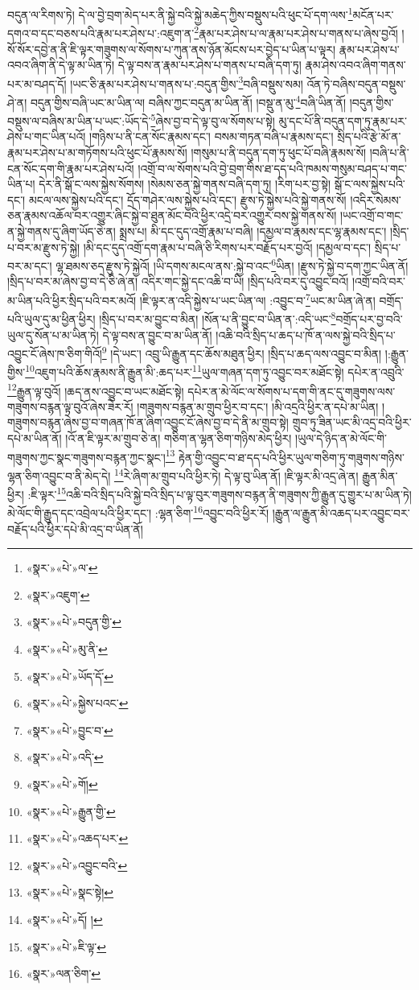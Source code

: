 བདུན་ལ་རིགས་ཏེ། དེ་ལ་བྱེ་བྲག་མེད་པར་ནི་སྐྱེ་བའི་སྐྱེ་མཆེད་ཀྱིས་བསྡུས་པའི་ཕུང་པོ་དག་ལས་\footnote{«སྣར་»«པེ་»ལ་}མངོན་པར་དགའ་བ་དང་བཅས་པའི་རྣམ་པར་ཤེས་པ་:འཇུག་ན་\footnote{«སྣར་»འཇུག་}རྣམ་པར་ཤེས་པ་ལ་རྣམ་པར་ཤེས་པ་གནས་པ་ཞེས་བྱའོ། །སོ་སོར་དབྱེ་ན་ནི་ཇི་ལྟར་གཟུགས་ལ་སོགས་པ་ཀུན་ནས་ཉོན་མོངས་པར་བྱེད་པ་ཡིན་པ་ལྟར། རྣམ་པར་ཤེས་པ་འབའ་ཞིག་ནི་དེ་ལྟ་མ་ཡིན་ཏེ། དེ་ལྟ་བས་ན་རྣམ་པར་ཤེས་པ་གནས་པ་བཞི་དག་ཏུ། རྣམ་ཤེས་འབའ་ཞིག་གནས་པར་མ་བཤད་དོ། །ཡང་ཅི་རྣམ་པར་ཤེས་པ་གནས་པ་:བདུན་གྱིས་\footnote{«སྣར་»«པེ་»བདུན་གྱི་}བཞི་བསྡུས་སམ། འོན་ཏེ་བཞིས་བདུན་བསྡུས་ཤེ་ན། བདུན་གྱིས་བཞི་ཡང་མ་ཡིན་ལ། བཞིས་ཀྱང་བདུན་མ་ཡིན་ནོ། །བསྡུ་ན་མུ་\footnote{«སྣར་»«པེ་»མུ་ནི་}བཞི་ཡིན་ནོ། །བདུན་གྱིས་བསྡུས་ལ་བཞིས་མ་ཡིན་པ་ཡང་:ཡོད་དེ་\footnote{«སྣར་»«པེ་»ཡོད་དོ་}ཞེས་བྱ་བ་དེ་ལྟ་བུ་ལ་སོགས་པ་སྟེ། མུ་དང་པོ་ནི་བདུན་དག་ཏུ་རྣམ་པར་ཤེས་པ་གང་ཡིན་པའོ། །གཉིས་པ་ནི་ངན་སོང་རྣམས་དང་། བསམ་གཏན་བཞི་པ་རྣམས་དང་། སྲིད་པའི་རྩེ་མོ་ན་རྣམ་པར་ཤེས་པ་མ་གཏོགས་པའི་ཕུང་པོ་རྣམས་སོ། །གསུམ་པ་ནི་བདུན་དག་ཏུ་ཕུང་པོ་བཞི་རྣམས་སོ། །བཞི་པ་ནི་ངན་སོང་དག་གི་རྣམ་པར་ཤེས་པའོ། །འགྲོ་བ་ལ་སོགས་པའི་བྱེ་བྲག་གིས་ཐ་དད་པའི་ཁམས་གསུམ་བཤད་པ་གང་ཡིན་པ། དེར་ནི་སྒོ་ང་ལས་སྐྱེས་སོགས། །སེམས་ཅན་སྐྱེ་གནས་བཞི་དག་ཏུ། །རིག་པར་བྱ་སྟེ། སྒོ་ང་ལས་སྐྱེས་པའི་དང་། མངལ་ལས་སྐྱེས་པའི་དང་། དྲོད་གཤེར་ལས་སྐྱེས་པའི་དང་། རྫུས་ཏེ་སྐྱེས་པའི་སྐྱེ་གནས་སོ། །འདིར་སེམས་ཅན་རྣམས་འཆོལ་བར་འགྱུར་ཞིང་སྐྱེ་བ་ཐུན་མོང་བའི་ཕྱིར་འདྲེ་བར་འགྱུར་བས་སྐྱེ་གནས་སོ། །ཡང་འགྲོ་བ་གང་ན་སྐྱེ་གནས་དུ་ཞིག་ཡོད་ཅེ་ན། སྨྲས་པ། མི་དང་དུད་འགྲོ་རྣམ་པ་བཞི། །དམྱལ་བ་རྣམས་དང་ལྷ་རྣམས་དང་། །སྲིད་པ་བར་མ་རྫུས་ཏེ་སྐྱེ། །མི་དང་དུད་འགྲོ་དག་རྣམ་པ་བཞི་ཅི་རིགས་པར་བརྗོད་པར་བྱའོ། །དམྱལ་བ་དང་། སྲིད་པ་བར་མ་དང་། ལྷ་ཐམས་ཅད་རྫུས་ཏེ་སྐྱེའོ། །ཡི་དགས་མངལ་ནས་:སྐྱེ་བ་འང་\footnote{«སྣར་»«པེ་»སྐྱེས་པའང་}ཡིན། །རྫུས་ཏེ་སྐྱེ་བ་དག་ཀྱང་ཡིན་ནོ། །སྲིད་པ་བར་མ་ཞེས་བྱ་བ་དེ་ཅི་ཞེ་ན། འདིར་གང་སྐྱེ་དང་འཆི་བ་ཡི། །སྲིད་པའི་བར་དུ་འབྱུང་བའོ། །འགྲོ་བའི་བར་མ་ཡིན་པའི་ཕྱིར་སྲིད་པའི་བར་མའོ། །ཇི་ལྟར་ན་འདི་སྐྱེས་པ་ཡང་ཡིན་ལ། :འབྱུང་བ་\footnote{«སྣར་»«པེ་»བྱུང་བ་}ཡང་མ་ཡིན་ཞེ་ན། བགྲོད་པའི་ཡུལ་དུ་མ་ཕྱིན་ཕྱིར། །སྲིད་པ་བར་མ་བྱུང་བ་མིན། །སོན་པ་ནི་བྱུང་བ་ཡིན་ན་:འདི་ཡང་\footnote{«སྣར་»«པེ་»འདི་}བགྲོད་པར་བྱ་བའི་ཡུལ་དུ་སོན་པ་མ་ཡིན་ཏེ། དེ་ལྟ་བས་ན་བྱུང་བ་མ་ཡིན་ནོ། །འཆི་བའི་སྲིད་པ་ཆད་པ་ཁོ་ན་ལས་སྐྱེ་བའི་སྲིད་པ་འབྱུང་ངོ་ཞེས་ཁ་ཅིག་གིའོ།\footnote{«སྣར་»«པེ་»གོ།} །དེ་ཡང་། འབྲུ་ཡི་རྒྱུན་དང་ཆོས་མཐུན་ཕྱིར། །སྲིད་པ་ཆད་ལས་འབྱུང་བ་མིན། །:རྒྱུན་གྱིས་\footnote{«སྣར་»«པེ་»རྒྱུན་གྱི་}འཇུག་པའི་ཆོས་རྣམས་ནི་རྒྱུན་མི་:ཆད་པར་\footnote{«སྣར་»«པེ་»འཆད་པར་}ཡུལ་གཞན་དག་ཏུ་འབྱུང་བར་མཐོང་སྟེ། དཔེར་ན་འབྲུའི་\footnote{«སྣར་»«པེ་»འབྱུང་བའི་}རྒྱུན་ལྟ་བུའོ། །ཆད་ནས་འབྱུང་བ་ཡང་མཐོང་སྟེ། དཔེར་ན་མེ་ལོང་ལ་སོགས་པ་དག་གི་ནང་དུ་གཟུགས་ལས་གཟུགས་བརྙན་ལྟ་བུའོ་ཞེས་ཟེར་རོ། །གཟུགས་བརྙན་མ་གྲུབ་ཕྱིར་བ་དང་། །མི་འདྲའི་ཕྱིར་ན་དཔེ་མ་ཡིན། །གཟུགས་བརྙན་ཞེས་བྱ་བ་གཞན་ཁོ་ན་ཞིག་འབྱུང་ངོ་ཞེས་བྱ་བ་དེ་ནི་མ་གྲུབ་སྟེ། གྲུབ་ཏུ་ཟིན་ཡང་མི་འདྲ་བའི་ཕྱིར་དཔེ་མ་ཡིན་ནོ། །འོ་ན་ཇི་ལྟར་མ་གྲུབ་ཅེ་ན། གཅིག་ན་ལྷན་ཅིག་གཉིས་མེད་ཕྱིར། །ཡུལ་དེ་ཉིད་ན་མེ་ལོང་གི་གཟུགས་ཀྱང་སྣང་གཟུགས་བརྙན་ཀྱང་སྣང་།\footnote{«སྣར་»«པེ་»སྣང་སྟེ།} རྟེན་གྱི་འབྱུང་བ་ཐ་དད་པའི་ཕྱིར་ཡུལ་གཅིག་ཏུ་གཟུགས་གཉིས་ལྷན་ཅིག་འབྱུང་བ་ནི་མེད་དེ། \footnote{«སྣར་»«པེ་»དོ། ། }རེ་ཞིག་མ་གྲུབ་པའི་ཕྱིར་ཏེ། དེ་ལྟ་བུ་ཡིན་ནོ། །ཇི་ལྟར་མི་འདྲ་ཞེ་ན། རྒྱུན་མིན་ཕྱིར། :ཇི་ལྟར་\footnote{«སྣར་»«པེ་»ཇི་ལྟ་}འཆི་བའི་སྲིད་པའི་སྐྱེ་བའི་སྲིད་པ་ལྟ་བུར་གཟུགས་བརྙན་ནི་གཟུགས་ཀྱི་རྒྱུན་དུ་གྱུར་པ་མ་ཡིན་ཏེ། མེ་ལོང་གི་རྒྱུད་དང་འབྲེལ་པའི་ཕྱིར་དང་། :ལྷན་ཅིག་\footnote{«སྣར་»ལན་ཅིག་}འབྱུང་བའི་ཕྱིར་རོ། །རྒྱུན་ལ་རྒྱུན་མི་འཆད་པར་འབྱུང་བར་བརྗོད་པའི་ཕྱིར་དཔེ་མི་འདྲ་བ་ཡིན་ནོ། 